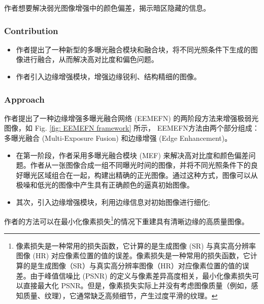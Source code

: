 \documentclass[letterpaper,10pt]{article}
\begin{document}
			作者想要解决弱光图像增强中的颜色偏差，揭示暗区隐藏的信息。
			
			\subsubsection{Contribution}
			
			\begin{itemize}
				\item[(1)] 
				作者提出了一种新型的多曝光融合模块和融合块，将不同光照条件下生成的图像进行融合，从而解决高对比度和偏色问题。
				
				\item[(2)]
				作者引入边缘增强模块，增强边缘锐利、结构精细的图像。
				
			\end{itemize}	
			
			\subsubsection{Approach}
			
			作者提出了一种边缘增强多曝光融合网络 (EEMEFN) 的两阶段方法来增强极弱光图像，如 Fig. \ref{fig: EEMEFN framework} 所示， EEMEFN方法由两个部分组成：多曝光融合 (Multi-Exposure Fusion) 和边缘增强 (Edge Enhancement)。
			
			\begin{itemize}
				\item[(1)] 
				在第一阶段，作者采用多曝光融合模块 (MEF) 来解决高对比度和颜色偏差问题。作者从一张图像合成一组不同曝光时间的图像，并将不同光照条件下的良好曝光区域组合在一起，构建出精确的正光图像。通过这种方式，图像可以从极噪和低光的图像中产生具有正确颜色的逼真初始图像。
				
				\item[(2)]
				其次，引入边缘增强模块，利用边缘信息对初始图像进行细化;
				
			\end{itemize}	
			
			作者的方法可以在最小化像素损失\footnote{像素损失是一种常用的损失函数，它计算的是生成图像 (SR) 与真实高分辨率图像 (HR) 对应像素位置的值的误差。像素损失是一种常用的损失函数，它计算的是生成图像（SR）与真实高分辨率图像（HR）对应像素位置的值的误差。由于峰值信噪比 (PSNR) 的定义与像素差异高度相关，最小化像素损失可以直接最大化 PSNR。但是，像素损失实际上并没有考虑图像质量（例如，感知质量、纹理），它通常缺乏高频细节，产生过度平滑的纹理。}的情况下重建具有清晰边缘的高质量图像。
			
\end{document}

